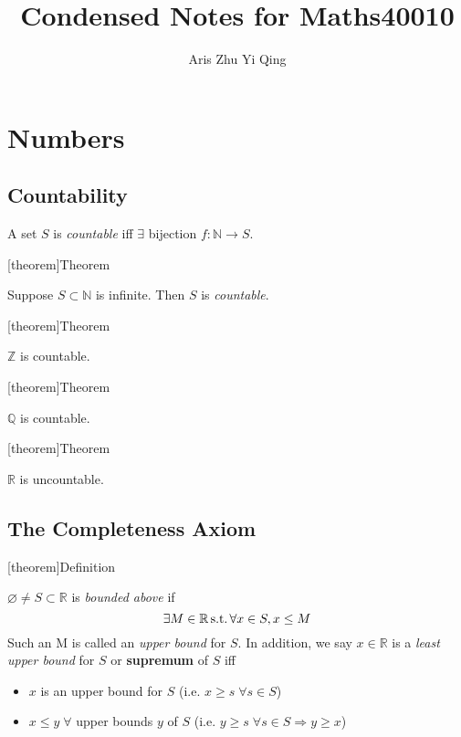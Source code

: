 \documentclass[12pt]{report}
\author{Aris Zhu Yi Qing}
\title{Condensed Notes for Maths40010}
\theoremstyle{definition}
\begin{document}
\maketitle
\tableofcontents

\chapter{Numbers}

\section{Countability}
\begin{theorem}
    A set $S$ is \emph{countable} iff $\exists$ bijection $f: \mathbb{N} \rightarrow S$.
\end{theorem}

[theorem]{Theorem}
\begin{subset of countable set}
    Suppose $S \subset \mathbb{N}$ is infinite. Then $S$ is \emph{countable}.
\end{subset of countable set}

[theorem]{Theorem}
\begin{Z is countable}
    $\mathbb{Z}$ is countable.
\end{Z is countable}

[theorem]{Theorem}
\begin{Q is countable}
    $\mathbb{Q}$ is countable.
\end{Q is countable}

[theorem]{Theorem}
\begin{R is uncountable}
    $\mathbb{R}$ is uncountable.
\end{R is uncountable}

\section{The Completeness Axiom}
[theorem]{Definition}
\begin{upper bound and sup}
    $\varnothing \neq S \subset \mathbb{R}$ is \emph{bounded above} if \[
        \exists M \in \mathbb{R} \,\textnormal{s.t.} \, \forall x \in S, x \le M
    \]
    Such an M is called an \emph{upper bound} for $S$. 
    In addition, we say $x \in \mathbb{R}$ is a \emph{least upper bound} for $S$ or \textbf{supremum} of $S$ iff
    \begin{itemize}
        \item $x$ is an upper bound for $S$ (i.e. $x \ge s \;\forall s \in S$)
        \item $x \le y \;\forall$ upper bounds $y$ of $S$ (i.e. $y \ge s \;\forall s \in S \Rightarrow y \ge x$)
    \end{itemize}
\end{upper bound and sup}
\end{document}
